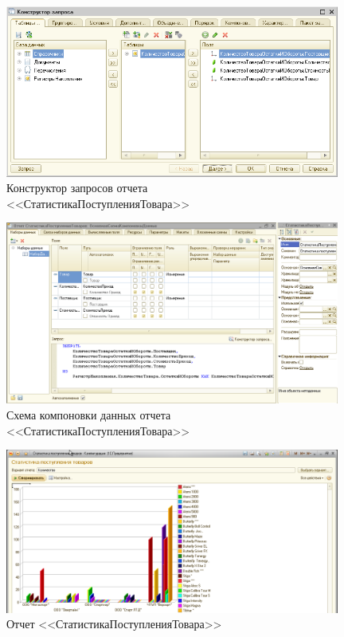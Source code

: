 \begin{figure}[h!]
  \centering
  \includegraphics[width=110mm]{pic/report_stats_query}
  \caption{Конструктор запросов отчета \\ <<СтатистикаПоступленияТовара>>}
  \label{fig:report_stats_query}
\end{figure}

\begin{figure}[h!]
  \centering
  \includegraphics[width=110mm]{pic/report_stats_scheme}
  \caption{Схема компоновки данных отчета \\ <<СтатистикаПоступленияТовара>>}
  \label{fig:report_stats_scheme}
\end{figure}

\begin{figure}[h!]
  \centering
  \includegraphics[width=110mm]{pic/report_stats}
  \caption{Отчет <<СтатистикаПоступленияТовара>>}
  \label{fig:report_stats}
\end{figure}

